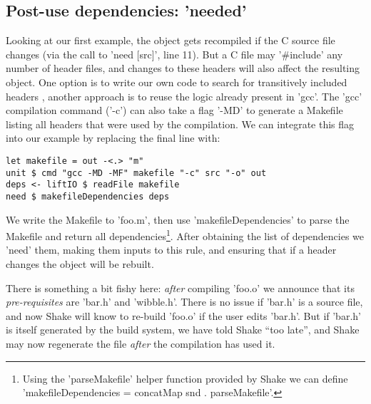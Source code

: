 \subsection{Post-use dependencies: \lst'needed'\label{sec:needed}}

Looking at our first example, the object gets recompiled if the C source file
changes (via the call to \lst'need [src]', line 11).
But a C file may \lst'#include' any number of header files, and changes
to these headers will also affect the resulting object. One option is to
write our own code to search for transitively included headers
\cite[\S6.4]{shake}, another approach is to reuse the logic already present
in \lst'gcc'. The \lst'gcc' compilation command (\lst'-c') can also take a flag
\lst'-MD' to generate a Makefile listing all headers that were used by the
compilation. We can integrate this flag into our example by replacing the final
line with:

\begin{lstlisting}
let makefile = out -<.> "m"
unit $ cmd "gcc -MD -MF" makefile "-c" src "-o" out
deps <- liftIO $ readFile makefile
need $ makefileDependencies deps
\end{lstlisting}

\noindent We write the Makefile to \lst'foo.m', then use
\lst'makefileDependencies' to parse the Makefile and return all
dependencies\footnote{Using the \lst'parseMakefile' helper function
provided by Shake we can define
\lst'makefileDependencies = concatMap snd . parseMakefile'.}. After obtaining the
list of dependencies we \lst'need' them, making them inputs to this rule, and
ensuring that if a header changes the object will be rebuilt.

There is something a bit fishy here: \emph{after} compiling \lst'foo.o' we
announce that its \emph{pre-requisites} are \lst'bar.h' and \lst'wibble.h'.
There is no issue if \lst'bar.h' is a source file, and now
Shake will know to re-build \lst'foo.o' if the user edits \lst'bar.h'.
But if \lst'bar.h' is itself generated by the build system,
we have told Shake ``too late'', and Shake may now regenerate the file
\emph{after} the compilation has used it.


